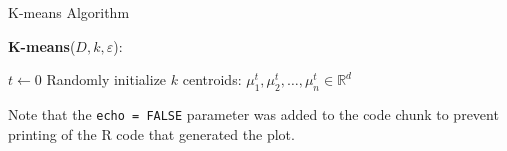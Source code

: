 \documentclass[
]{article}
\begin{document}
\begin{algorithm}
\LinesNumbered %
\caption{K-means Algorithm}

\textbf{K-means}($D, k, \varepsilon$): {
  
  $t \leftarrow 0$\;
  Randomly initialize $k$ centroids: $\mu_{1}^{t}, \mu_{2}^{t}, \ldots, \mu_{n}^{t} \in \mathbb{R}^d$\;
}
\end{algorithm}

Note that the \texttt{echo\ =\ FALSE} parameter was added to the code
chunk to prevent printing of the R code that generated the plot.
\end{document}
